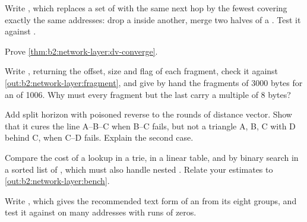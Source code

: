 \begin{exercise}[$\star\star$]\label{exo:b2:network-layer:7}
Write , which replaces a set of  with the same next hop by the fewest 
covering exactly the same addresses: drop a  inside another, merge two halves of a . Test it against
.
\end{exercise}

\begin{exercise}[$\star\star$]\label{exo:b2:network-layer:8}
Prove \cref{thm:b2:network-layer:dv-converge}.
\end{exercise}

\begin{exercise}[$\star\star$]\label{exo:b2:network-layer:9}
Write , returning the offset, size and flag of each fragment, check it against
\cref{out:b2:network-layer:fragment}, and give by hand the fragments of 3000 bytes for an  of 1006. Why must
every fragment but the last carry a multiple of 8 bytes?
\end{exercise}

\begin{exercise}[$\star\star\star$]\label{exo:b2:network-layer:10}
Add split horizon with poisoned reverse to the rounds of distance vector. Show that it cures the line A--B--C when
B--C fails, but not a triangle A, B, C with D behind C, when C--D fails. Explain the second case.
\end{exercise}

\begin{exercise}[$\star\star\star$]\label{exo:b2:network-layer:11}
Compare the cost of a lookup in a trie, in a linear table, and by binary search in a sorted list of , which
must also handle nested . Relate your estimates to \cref{out:b2:network-layer:bench}.
\end{exercise}

\begin{exercise}[$\star\star\star$]\label{exo:b2:network-layer:12}
Write , which gives the recommended text form of an  from its eight groups, and
test it against  on many addresses with runs of zeros.
\end{exercise}

